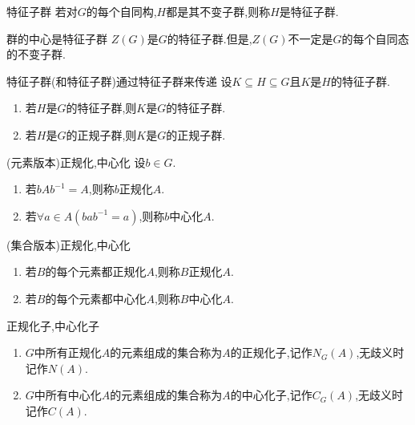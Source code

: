 \begin{definition}{特征子群}{}
	若对$G$的每个自同构,$H$都是其不变子群,则称$H$是特征子群.
\end{definition}

\begin{example}{群的中心是特征子群}{}
	$Z\left(G\right)$是$G$的特征子群.但是,$Z\left(G\right)$不一定是$G$的每个自同态的不变子群.
\end{example}

\begin{proposition}{特征子群(和特征子群)通过特征子群来传递}{}
	设$K\subseteq H\subseteq G$且$K$是$H$的特征子群.
	\begin{enumerate}
		\item 若$H$是$G$的特征子群,则$K$是$G$的特征子群.
		\item 若$H$是$G$的正规子群,则$K$是$G$的正规子群.
	\end{enumerate}
\end{proposition}

\begin{definition}{(元素版本)正规化,中心化}{}
	设$b\in G$.
	\begin{enumerate}
		\item 若$bAb^{-1}=A$,则称$b$正规化$A$.
		\item 若$\forall a\in A\left(bab^{-1}=a\right)$,则称$b$中心化$A$.
	\end{enumerate}
\end{definition}

\begin{definition}{(集合版本)正规化,中心化}{}
	\begin{enumerate}
	\item 若$B$的每个元素都正规化$A$,则称$B$正规化$A$.
	\item 若$B$的每个元素都中心化$A$,则称$B$中心化$A$.
\end{enumerate}
\end{definition}

\begin{definition}{正规化子,中心化子}{}
	\begin{enumerate}
		\item $G$中所有正规化$A$的元素组成的集合称为$A$的正规化子,记作$N_{G}\left(A\right)$,无歧义时记作$N\left(A\right)$.
		\item $G$中所有中心化$A$的元素组成的集合称为$A$的中心化子,记作$C_{G}\left(A\right)$,无歧义时记作$C\left(A\right)$.
	\end{enumerate}
\end{definition}

